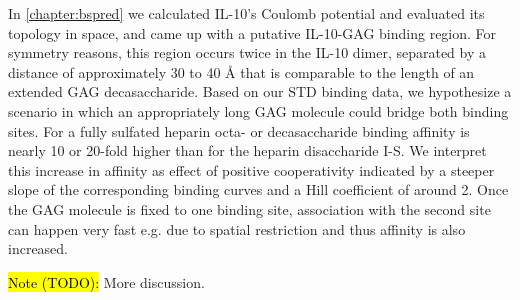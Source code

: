 In \cref{chapter:bspred} we calculated IL-10's Coulomb potential and evaluated
its topology in space, and came up with a putative IL-10-GAG binding region. For
symmetry reasons, this region occurs twice in the IL-10 dimer, separated by a
distance of approximately 30 to 40 Å that is comparable to the length of an
extended GAG decasaccharide. Based on our STD binding data, we hypothesize a
scenario in which an appropriately long GAG molecule could bridge both binding
sites. For a fully sulfated heparin octa- or decasaccharide binding affinity is
nearly 10 or 20-fold higher than for the heparin disaccharide I-S. We interpret
this increase in affinity as effect of positive cooperativity indicated by a
steeper slope of the corresponding binding curves and a Hill coefficient of
around 2. Once the GAG molecule is fixed to one binding site, association with
the second site can happen very fast e.g. due to spatial restriction and thus
affinity is also increased.

\hl{Note (TODO):}
More discussion.




